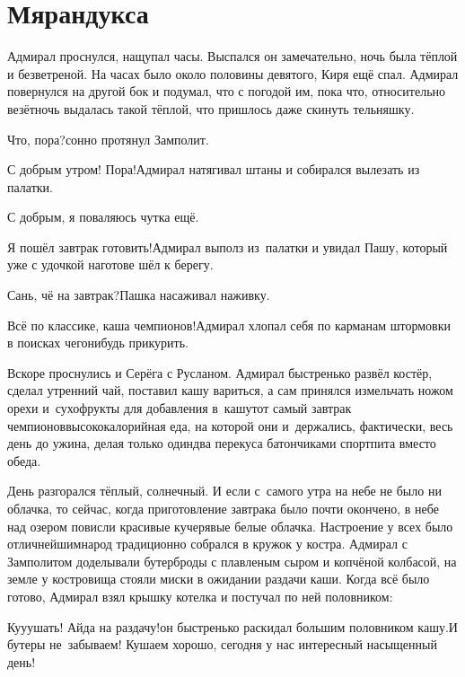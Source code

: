 \chapter{Мярандукса}
\vepsianrose

Адмирал проснулся, нащупал часы. Выспался он замечательно, ночь была тёплой и безветреной. На часах было около половины девятого, Киря ещё спал. Адмирал повернулся на другой бок и подумал, что с погодой им, пока что, относительно везёт\mdash ночь выдалась такой тёплой, что пришлось даже скинуть тельняшку.

\diagdash Что, пора?\mdash сонно протянул Замполит.

\diagdash С добрым утром! Пора!\mdash Адмирал натягивал штаны и собирался вылезать из палатки.

\diagdash С добрым, я поваляюсь чутка ещё.

\diagdash Я пошёл завтрак готовить!\mdash Адмирал выполз из~палатки и увидал Пашу, который уже с удочкой наготове шёл к берегу.

\diagdash Сань, чё на завтрак?\mdash Пашка насаживал наживку.

\diagdash Всё по классике, каша чемпионов!\mdash Адмирал хлопал себя по карманам штормовки в поисках чего\sdash нибудь прикурить.

Вскоре проснулись и Серёга с Русланом. Адмирал быстренько развёл костёр, сделал утренний чай, поставил кашу вариться, а сам принялся измельчать ножом орехи и~сухофрукты для добавления в~кашу\mdash тот самый завтрак чемпионов\mdash высококалорийная еда, на которой они и~держались, фактически, весь день до ужина, делая только один\sdash два перекуса батончиками спортпита вместо обеда. 

День разгорался тёплый, солнечный. И если с~самого утра на небе не было ни облачка, то сейчас, когда приготовление завтрака было почти окончено, в небе над озером повисли красивые кучерявые белые облачка. Настроение у всех было отличнейшим\mdash народ традиционно собрался в кружок у костра. Адмирал с Замполитом доделывали бутерброды с плавленым сыром и копчёной колбасой, на земле у костровища стояли миски в ожидании раздачи каши. Когда всё было готово, Адмирал взял крышку котелка и постучал по ней половником:

\diagdash К\sdash у\sdash у\sdash ушать! Айда на раздачу!\mdash он быстренько раскидал большим половником кашу.\mdash И бутеры не~забываем! Кушаем хорошо, сегодня у нас интересный насыщенный день!

